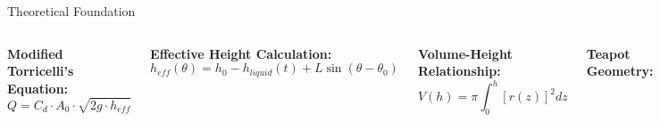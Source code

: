 \documentclass[aspectratio=169]{beamer}
\begin{document}
\begin{frame}{Theoretical Foundation}
\begin{columns}[T]
\textbf{Modified Torricelli's Equation:}
\begin{equation}
Q = C_d \cdot A_0 \cdot \sqrt{2g \cdot h_{eff}}
\end{equation}

\textbf{Effective Height Calculation:}
\begin{equation}
h_{eff}(\theta) = h_0 - h_{liquid}(t) + L \sin(\theta - \theta_0)
\end{equation}

\textbf{Volume-Height Relationship:}
\begin{equation}
V(h) = \pi \int_0^h [r(z)]^2 dz
\end{equation}

\textbf{Teapot Geometry:}
\begin{itemize}
    \item \textbf{Shape:} Inverted truncated cone
    \item \textbf{Top diameter:} 7.1cm
    \item \textbf{Bottom diameter:} 7.5cm
    \item \textbf{Outlet diameter:} 5mm
    \item \textbf{Height:} 9.5cm
\end{itemize}

\begin{alertblock}{Key Parameters}
$C_d$ = 0.6-0.8 (discharge coefficient)\\
$\theta_0$ = 167° (horizontal reference)
\end{alertblock}
\end{columns}
\end{frame}
\end{document}
